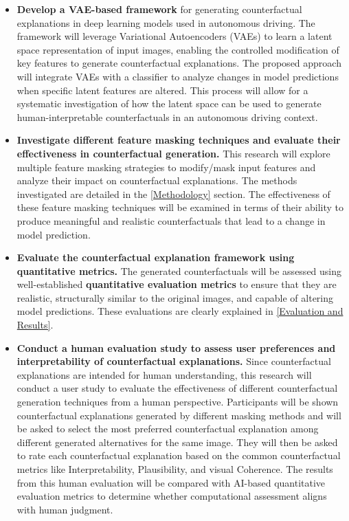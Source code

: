 \begin{itemize}
    \item \textbf{Develop a VAE-based framework} for generating counterfactual explanations in deep learning models used in autonomous driving.
    The framework will leverage Variational Autoencoders (VAEs) to learn a latent space representation of input images, enabling the controlled modification of key features to generate counterfactual explanations. The proposed approach will integrate VAEs with a classifier to analyze changes in model predictions when specific latent features are altered. This process will allow for a systematic investigation of how the latent space can be used to generate human-interpretable counterfactuals in an autonomous driving context.

    \item \textbf{Investigate different feature masking techniques and evaluate their effectiveness in counterfactual generation.}  
    This research will explore multiple feature masking strategies to modify/mask input features and analyze their impact on counterfactual explanations. The methods investigated are detailed in the \cref{Methodology} section. The effectiveness of these feature masking techniques will be examined in terms of their ability to produce meaningful and realistic counterfactuals that lead to a change in model prediction.
    
    \item \textbf{Evaluate the counterfactual explanation framework using quantitative metrics.}  
    The generated counterfactuals will be assessed using well-established \textbf{quantitative evaluation metrics} to ensure that they are realistic, structurally similar to the original images, and capable of altering model predictions. These evaluations are clearly explained in \cref{Evaluation and Results}.

    \item \textbf{Conduct a human evaluation study to assess user preferences and interpretability of counterfactual explanations.}  
    Since counterfactual explanations are intended for human understanding, this research will conduct a user study to evaluate the effectiveness of different counterfactual generation techniques from a human perspective. Participants will be shown counterfactual explanations generated by different masking methods and will be asked to select the most preferred counterfactual explanation among different generated alternatives for the same image. They will then be asked to rate each counterfactual explanation based on the common counterfactual metrics like Interpretability, Plausibility, and visual Coherence. The results from this human evaluation will be compared with AI-based quantitative evaluation metrics to determine whether computational assessment aligns with human judgment.

\end{itemize}


